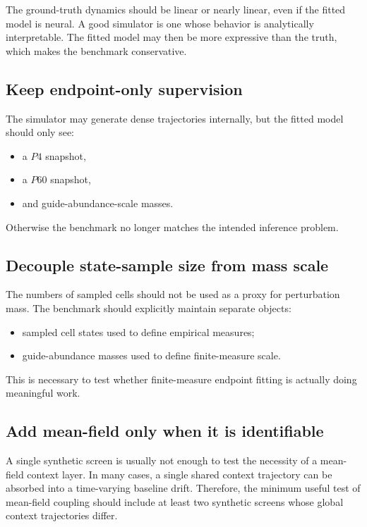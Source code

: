 \documentclass[11pt]{article}
\begin{document}
The ground-truth dynamics should be linear or nearly linear, even if the fitted model is neural. A good simulator is one whose behavior is analytically interpretable. The fitted model may then be more expressive than the truth, which makes the benchmark conservative.

\subsection{Keep endpoint-only supervision}

The simulator may generate dense trajectories internally, but the fitted model should only see:
\begin{itemize}[leftmargin=2em]
    \item a $P4$ snapshot,
    \item a $P60$ snapshot,
    \item and guide-abundance-scale masses.
\end{itemize}
Otherwise the benchmark no longer matches the intended inference problem.

\subsection{Decouple state-sample size from mass scale}

The numbers of sampled cells should not be used as a proxy for perturbation mass. The benchmark should explicitly maintain separate objects:
\begin{itemize}[leftmargin=2em]
    \item sampled cell states used to define empirical measures;
    \item guide-abundance masses used to define finite-measure scale.
\end{itemize}
This is necessary to test whether finite-measure endpoint fitting is actually doing meaningful work.

\subsection{Add mean-field only when it is identifiable}

A single synthetic screen is usually not enough to test the necessity of a mean-field context layer. In many cases, a single shared context trajectory can be absorbed into a time-varying baseline drift. Therefore, the minimum useful test of mean-field coupling should include at least two synthetic screens whose global context trajectories differ.
\end{document}
